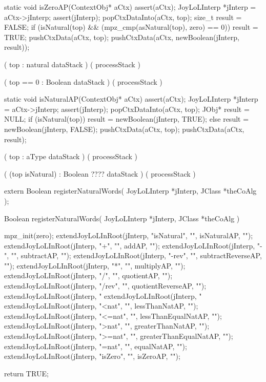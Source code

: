 \stopWord

\startCCode
static void isZeroAP(ContextObj* aCtx) {
  assert(aCtx);
  JoyLoLInterp *jInterp = aCtx->jInterp;
  assert(jInterp);
  popCtxDataInto(aCtx, top);
  size_t result = FALSE;
  if (isNatural(top) &&
      (mpz_cmp(asNatural(top), zero) == 0)) result = TRUE;
  pushCtxData(aCtx, top);
  pushCtxData(aCtx, newBoolean(jInterp, result));
}
\stopCCode

\startWord[isZero]

\preDataStack
  (
    top : natural
    dataStack
  )
\preProcessStack
  ( processStack )
\preConditions
\stopPreConditions

\postDataStack
  (
    top == 0 : Boolean
    dataStack
  )
\postProcessStack
  ( processStack )
\postConditions
\stopPostConditions

\stopWord

\startCCode
static void isNaturalAP(ContextObj* aCtx) {
  assert(aCtx);
  JoyLoLInterp *jInterp = aCtx->jInterp;
  assert(jInterp);
  popCtxDataInto(aCtx, top);
  JObj* result = NULL;
  if (isNatural(top))
    result = newBoolean(jInterp, TRUE);
  else
    result = newBoolean(jInterp, FALSE);
  pushCtxData(aCtx, top);
  pushCtxData(aCtx, result);
}
\stopCCode

\startWord[isNatural]

\preDataStack
  (
    top : aType
    dataStack
  )
\preProcessStack
  ( processStack )
\preConditions
\stopPreConditions

\postDataStack
  ( 
    (top isNatural) : Boolean ????
    dataStack
  )
\postProcessStack
  ( processStack )
\postConditions
\stopPostConditions

\stopWord

\startCHeader
extern Boolean registerNaturalWords(
  JoyLoLInterp *jInterp,
  JClass       *theCoAlg
);
\stopCHeader
{}

\startCCode
Boolean registerNaturalWords(
  JoyLoLInterp *jInterp,
  JClass       *theCoAlg
) {
  mpz_init(zero);
  extendJoyLoLInRoot(jInterp, "isNatural", "", isNaturalAP,           "");
  extendJoyLoLInRoot(jInterp, "+",         "", addAP,                 "");
  extendJoyLoLInRoot(jInterp, "-",         "", subtractAP,            "");
  extendJoyLoLInRoot(jInterp, "-rev",      "", subtractReverseAP,     "");
  extendJoyLoLInRoot(jInterp, "*",         "", multiplyAP,            "");
  extendJoyLoLInRoot(jInterp, "/",         "", quotientAP,            "");
  extendJoyLoLInRoot(jInterp, "/rev",      "", quotientReverseAP,     "");
  extendJoyLoLInRoot(jInterp, "%
  extendJoyLoLInRoot(jInterp, "%
  extendJoyLoLInRoot(jInterp, "<nat",      "", lessThanNatAP,         "");
  extendJoyLoLInRoot(jInterp, "<=nat",     "", lessThanEqualNatAP,    "");
  extendJoyLoLInRoot(jInterp, ">nat",      "", greaterThanNatAP,      "");
  extendJoyLoLInRoot(jInterp, ">=nat",     "", greaterThanEqualNatAP, "");
  extendJoyLoLInRoot(jInterp, "=nat",      "", equalNatAP,            "");
  extendJoyLoLInRoot(jInterp, "isZero",    "", isZeroAP,              "");
  
  return TRUE;
}
\stopCCode

